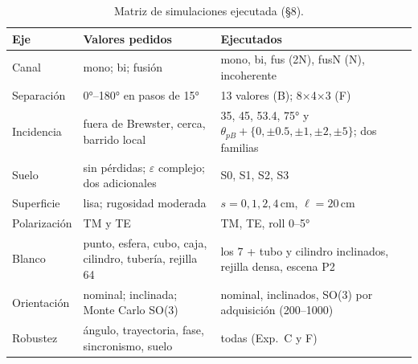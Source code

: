 \begin{table}[H]
\centering\small
\caption{Matriz de simulaciones ejecutada (§8).}
\label{tab:matriz}
\begin{tabular}{@{}L{2.6cm}L{6.2cm}L{5.4cm}@{}}
\toprule
Eje & Valores pedidos & Ejecutados \\
\midrule
Canal & mono; bi; fusión & mono, bi, fus (2N), fusN (N), incoherente \\
Separación & 0°--180° en pasos de 15° & 13 valores (B); 8$\times$4$\times$3 (F) \\
Incidencia & fuera de Brewster, cerca, barrido local & 35, 45, 53.4, 75° y $\theta_{pB}+\{0,\pm0.5,\pm1,\pm2,\pm5\}$; dos familias \\
Suelo & sin pérdidas; $\varepsilon$ complejo; dos adicionales & S0, S1, S2, S3 \\
Superficie & lisa; rugosidad moderada & $s=0,1,2,4$\,cm, $\ell=20$\,cm \\
Polarización & TM y TE & TM, TE, roll 0--5° \\
Blanco & punto, esfera, cubo, caja, cilindro, tubería, rejilla 64 & los 7 + tubo y cilindro inclinados, rejilla densa, escena P2 \\
Orientación & nominal; inclinada; Monte Carlo SO(3) & nominal, inclinados, SO(3) por adquisición (200--1000) \\
Robustez & ángulo, trayectoria, fase, sincronismo, suelo & todas (Exp.~C y F) \\
\bottomrule
\end{tabular}
\end{table}
